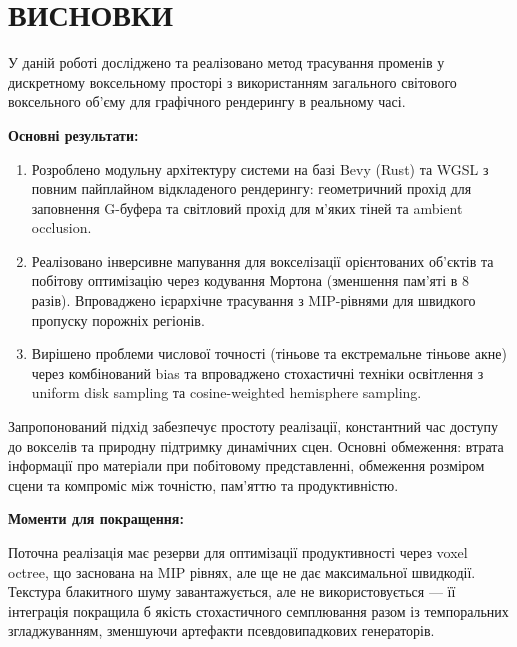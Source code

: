 \chapter*{ВИСНОВКИ}

У даній роботі досліджено та реалізовано метод трасування променів у дискретному воксельному просторі з використанням загального світового воксельного об'єму для графічного рендерингу в реальному часі.

\textbf{Основні результати:}

\begin{enumerate}[itemsep=0pt, topsep=0pt]
    \item Розроблено модульну архітектуру системи на базі Bevy (Rust) та WGSL з повним пайплайном відкладеного рендерингу: геометричний прохід для заповнення G-буфера та світловий прохід для м'яких тіней та ambient occlusion.

    \item Реалізовано інверсивне мапування для вокселізації орієнтованих об'єктів та побітову оптимізацію через кодування Мортона (зменшення пам'яті в 8 разів). Впроваджено ієрархічне трасування з MIP-рівнями для швидкого пропуску порожніх регіонів.

    \item Вирішено проблеми числової точності (тіньове та екстремальне тіньове акне) через комбінований bias та впроваджено стохастичні техніки освітлення з uniform disk sampling та cosine-weighted hemisphere sampling.
\end{enumerate}

Запропонований підхід забезпечує простоту реалізації, константний час доступу до вокселів та природну підтримку динамічних сцен. Основні обмеження: втрата інформації про матеріали при побітовому представленні, обмеження розміром сцени та компроміс між точністю, пам'яттю та продуктивністю.

\textbf{Моменти для покращення:}

Поточна реалізація має резерви для оптимізації продуктивності через voxel octree, що заснована на MIP рівнях, але ще не дає максимальної швидкодії. Текстура блакитного шуму завантажується, але не використовується --- її інтеграція покращила б якість стохастичного семплювання разом із темпоральних згладжуванням, зменшуючи артефакти псевдовипадкових генераторів.